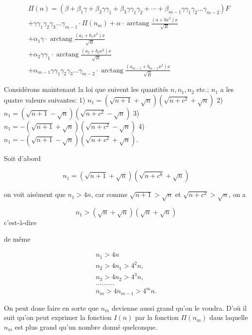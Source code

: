 \documentclass{article}
\begin{document}
\[
\begin{aligned}
& \Pi(n)=\left(\beta+\beta_{1} \gamma+\beta_{2} \gamma \gamma_{1}+\beta_{3} \gamma \gamma_{1} \gamma_{2}+\cdots+\beta_{m-1} \gamma \gamma_{1} \gamma_{2} \ldots \gamma_{m-2}\right) F \\
& +\gamma \gamma_{1} \gamma_{2} \gamma_{3} \ldots \gamma_{m-1} \cdot \Pi\left(n_{m}\right)+\alpha \cdot \operatorname{arctang} \frac{\left(a+b x^{2}\right) x}{\sqrt{R}} \\
& +\alpha_{1} \gamma \cdot \operatorname{arctang} \frac{\left(a_{1}+b_{1} x^{2}\right) x}{\sqrt{R}} \\
& +\alpha_{2} \gamma \gamma_{1} \cdot \operatorname{arctang} \frac{\left(a_{2}+b_{2} x^{2}\right) x}{\sqrt{R}} \\
& +\alpha_{m-1} \gamma \gamma_{1} \gamma_{2} \gamma_{3} \ldots \gamma_{m-2} \cdot \operatorname{arctang} \frac{\left(a_{m-1}+b_{m-1} x^{2}\right) x}{\sqrt{\bar{R}}}
\end{aligned}
\]

Considérons maintenaut la loi que suivent les quantités \(n, n_{1}, n_{2}\) etc.; \(n_{1}\) a les quatre valeurs suivantes:
1) \(n_{1}=(\sqrt{n+1}+\sqrt{n})\left(\sqrt{n+c^{2}}+\sqrt{n}\right)\)
2) \(n_{1}=(\sqrt{n+1}-\sqrt{n})\left(\sqrt{n+c^{2}}-\sqrt{n}\right)\)
3) \(n_{1}=-(\sqrt{n+1}+\sqrt{n})\left(\sqrt{n+c^{2}}-\sqrt{n}\right)\)
4) \(n_{1}=-(\sqrt{n+1}-\sqrt{n})\left(\sqrt{n+c^{2}}+\sqrt{n}\right)\).

Soit d'abord

\[
n_{1}=(\sqrt{n+1}+\sqrt{n})\left(\sqrt{n+c^{8}}+\sqrt{n}\right)
\]

on voit aisément que \(n_{1}>4 n\), car comme \(\sqrt{n+1}>\sqrt{n}\) et \(\sqrt{n+c^{2}}>\sqrt{n}\), on a

\[
n_{1}>(\sqrt{n}+\sqrt{n})(\sqrt{n}+\sqrt{n})
\]
c'est-à-dire

de même

\[
\begin{gathered}
n_{1}>4 n \\
n_{2}>4 n_{1}>4^{2} n, \\
n_{3}>4 n_{2}>4^{3} n, \\
\ldots . \ldots . . . \\
n_{m}>4 n_{m-1}>4^{m} n .
\end{gathered}
\]

On peut done faire en sorte que \(n_{m}\) devienne aussi grand qu'on le voudra. D'où il suit qu'on peut exprimer la fonction \(I(n)\) par la fonction \(\Pi\left(n_{m}\right)\) daus laquelle \(n_{m}\) est plus grand qu'un nombre donné quelconque.
\end{document}
